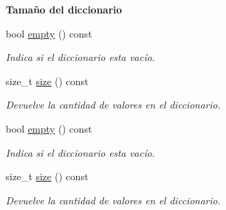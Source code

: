 \begin{Indent}{\bf \-Tamaño del diccionario}\par
\begin{DoxyCompactItemize}
\item 
bool \hyperlink{classaed2_1_1map_af5320ca0a7df4d16015441d5d055a7ee}{empty} () const 
\begin{DoxyCompactList}\small\item\em \-Indica si el diccionario esta vacío. \end{DoxyCompactList}\item 
size\-\_\-t \hyperlink{classaed2_1_1map_a89f2613f926ac13293eafe65889d6021}{size} () const 
\begin{DoxyCompactList}\small\item\em \-Devuelve la cantidad de valores en el diccionario. \end{DoxyCompactList}\item 
bool \hyperlink{classaed2_1_1map_af5320ca0a7df4d16015441d5d055a7ee}{empty} () const 
\begin{DoxyCompactList}\small\item\em \-Indica si el diccionario esta vacío. \end{DoxyCompactList}\item 
size\-\_\-t \hyperlink{classaed2_1_1map_a89f2613f926ac13293eafe65889d6021}{size} () const 
\begin{DoxyCompactList}\small\item\em \-Devuelve la cantidad de valores en el diccionario. \end{DoxyCompactList}\end{DoxyCompactItemize}
\end{Indent}
